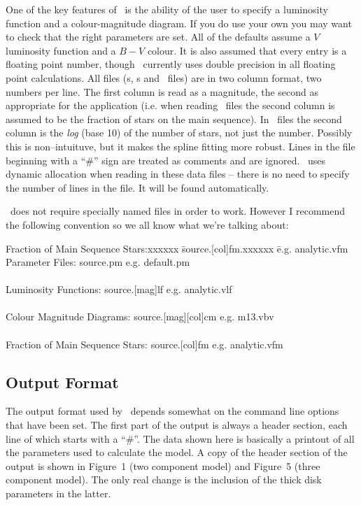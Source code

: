\documentclass[11pt,twoside]{article}
\begin{document}
One of the key features of \bsm\ is the  ability of the user  to specify a
luminosity function and a colour-magnitude diagram. If  you do use  your
own you may want to check that the right parameters are set.  All of the
defaults assume a $V$ luminosity function and a $B-V$  colour.  It is also
assumed that  every entry is a  floating point number, though 
\bsm\ currently uses double precision in all floating point calculations.
All files (\lf s, \cmd s and \fms\ files) are in two column format, two numbers
per line. The first column is read as a magnitude, the second as appropriate
for the application (i.e. when reading \fms\ files the second column is assumed
to be the fraction of stars on the main sequence). In \lf\ files the second
column is the {\em log} (base 10) of the number of stars, not just the number.
Possibly this is non--intuituve, but it makes the spline fitting more robust.
Lines in the file beginning with a ``\#'' sign are treated as comments and are
ignored. \bsm\ uses dynamic allocation when reading in these data files -- 
there is no need to specify the number of lines in the file. It will be
found automatically.

\bsm\ does not require specially named files  in order to work.  However I
recommend the following  convention so we  all know what  we're  talking
about:

\begin{tabbing}
Fraction of Main Sequence Stars:xxxxxx \= source.[col]fm.xxxxxx \= e.g. analytic.vfm \kill 
Parameter Files: \> source.pm \> e.g. default.pm \\ \\
Luminosity Functions: \> source.[mag]lf \> e.g. analytic.vlf \\ \\
Colour Magnitude Diagrams: \> source.[mag][col]cm \> e.g. m13.vbv \\ \\
Fraction of Main Sequence Stars: \> source.[col]fm \> e.g. analytic.vfm 
\end{tabbing}

\subsection{Output Format}

The output format used by \bsm\ depends somewhat on the command line options 
that have been set. The first part of the output is always a header section, 
each line of which starts with a ``\#''. The data shown here is basically a 
printout of all the parameters used to calculate the model. A copy of the 
header section of the output is shown in Figure~1 (two component model) and 
Figure~5 (three component model). The only real change is the inclusion of the 
thick disk parameters in the latter. 
\end{document}

